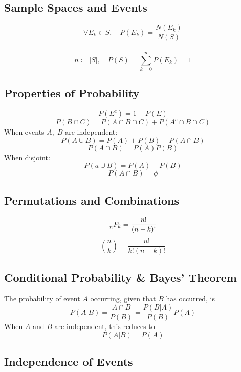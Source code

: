 \documentclass[10pt,twoside,a4paper]{article}
\begin{document}
\begin{multicols*}{2}
\begin{flushleft}
	\subsection{Sample Spaces and Events}
	$$\forall E_k \in S, \quad P(E_k) = \frac{N(E_k)}{N(S)}$$\\
	$$n \coloneqq |S|,\quad P(S) = \sum^{n}_{k=0}P(E_k) = 1$$

	\subsection{Properties of Probability}
	$$P(E^c) = 1 - P(E)$$
	$$P(B \cap C) = P(A \cap B \cap C) + P(A^c \cap B \cap C)$$
	\linebreak
	When events $A,\; B$ are independent:
	$$P(A \cup B) = P(A) + P(B) - P(A \cap B)$$
	$$P(A \cap B) = P(A)P(B)$$
	\linebreak
	When disjoint:
	$$P(a \cup B) = P(A) + P(B)$$
	$$P(A \cap B) = \phi$$

	\subsection{Permutations and Combinations}
	$$\prescript{}{n}{P_k} = \frac{n!}{(n-k)!}$$
	$$\binom{n}{k} = \frac{n!}{k!(n-k)!}$$

	\subsection{Conditional Probability \& Bayes' Theorem}
	The probability of event $A$ occurring, given that $B$ has occurred, is
	$$P(A|B) = \frac{A \cap B}{P(B)} = \frac{P(B|A)}{P(B)}P(A)$$
	When $A$ and $B$ are independent, this reduces to
	$$P(A|B) = P(A)$$



	\subsection{Independence of Events}




\end{flushleft}
\end{multicols*}
\end{document}
